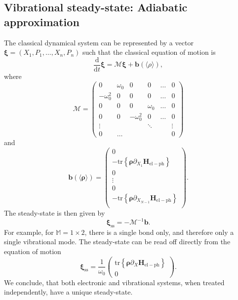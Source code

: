 \documentclass{article}
\newcommand{\dif}{\mathrm{d}}
\renewcommand{\vec}[1]{\mathbf{#1}}
\newcommand{\tr}[1]{\mathrm{tr}\left\{#1\right\}}
\begin{document}
\subsection{Vibrational steady-state: Adiabatic approximation}
The classical dynamical system can be represented by a vector $\bm{\xi} = (X_1,P_1,\dots,X_n,P_n)$ such that the classical equation of motion is 
\begin{equation}
	\frac{\dif }{\dif t}\bm{\xi} = \mathcal{M}\bm{\xi} + \vec{b}(\langle\rho\rangle),
\end{equation}
where 
\begin{equation}
	\mathcal{M} = \begin{pmatrix}
		0 & \omega_0 & 0 & 0 &\dots & 0\\
		-\omega_0^2 & 0 & 0 &  0& \dots & 0\\
		0 & 0 & 0 & \omega_0 & \dots & 0\\
		0 & 0 & -\omega_0^2 & 0 & \dots & 0\\
		\vdots &   &  &\ddots  & &\vdots\\
		0 & \dots & & &  &0
	\end{pmatrix}
\end{equation}
and 
\begin{equation}
	\vec{b}(\langle \bm{\rho}\rangle) = \begin{pmatrix}
		0 \\
		-\tr{\bm{\rho} \partial_{X_1}\vec{H}_\mathrm{el-ph}}\\
		0\\
		\vdots\\
		0 \\
		-\tr{\bm{\rho} \partial_{X_{N-1}}\vec{H}_\mathrm{el-ph}}\\
	\end{pmatrix}.
\end{equation}
The steady-state is then given by
\begin{equation}
	\bm{\xi}_\mathrm{ss} = -\mathcal{M}^{-1}\vec{b}.
\end{equation}
For example, for $\mathbb{M}=1\times 2$, there is a single bond only, and therefore only a single vibrational mode. 
The steady-state can be read off directly from the equation of motion
\begin{equation}
	\bm{\xi}_\mathrm{ss} = \frac{1}{\omega_0}\begin{pmatrix}
		 \tr{\bm{\rho} \partial_{X}\vec{H}_\mathrm{el-ph}}\\
		0
	\end{pmatrix}.\label{eq:PhaseSpace_NESS}
\end{equation}
We conclude, that both electronic and vibrational systems, when treated independently, have a unique steady-state.
\end{document}
